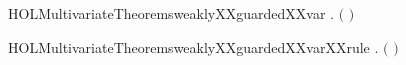 \newcommand{\HOLMultivariateTheoremsweaklyXXguardedXXsumXXrule}{\UseVerbatim{HOLMultivariateTheoremsweaklyXXguardedXXsumXXrule}}
\begin{SaveVerbatim}{HOLMultivariateTheoremsweaklyXXguardedXXvar}
\HOLTokenTurnstile{} \HOLSymConst{\HOLTokenForall{}} .   \ensuremath{(} \ensuremath{)} \HOLSymConst{\HOLTokenImp{}} \HOLSymConst{\HOLTokenNeg{}}  
\end{SaveVerbatim}
\newcommand{\HOLMultivariateTheoremsweaklyXXguardedXXvar}{\UseVerbatim{HOLMultivariateTheoremsweaklyXXguardedXXvar}}
\begin{SaveVerbatim}{HOLMultivariateTheoremsweaklyXXguardedXXvarXXrule}
\HOLTokenTurnstile{} \HOLSymConst{\HOLTokenForall{}} . \HOLSymConst{\HOLTokenNeg{}}   \HOLSymConst{\HOLTokenImp{}}   \ensuremath{(} \ensuremath{)}
\end{SaveVerbatim}
\newcommand{\HOLMultivariateTheoremsweaklyXXguardedXXvarXXrule}{\UseVerbatim{HOLMultivariateTheoremsweaklyXXguardedXXvarXXrule}}
